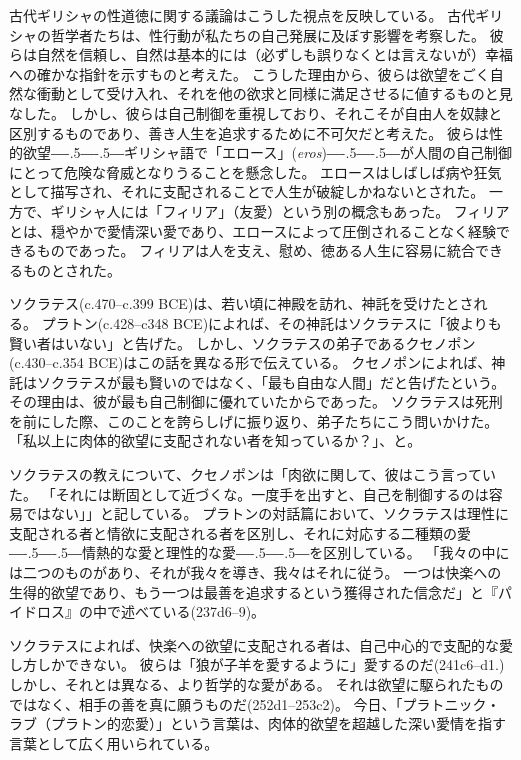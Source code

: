 \documentclass[paper=a4,book,openany]{jlreq}
\def\DDASH{―\kern-.5\zw―\kern-.5\zw―}
\begin{document}
古代ギリシャの性道徳に関する議論はこうした視点を反映している。
古代ギリシャの哲学者たちは、性行動が私たちの自己発展に及ぼす影響を考察した。
彼らは自然を信頼し、自然は基本的には（必ずしも誤りなくとは言えないが）幸福への確かな指針を示すものと考えた。
こうした理由から、彼らは欲望をごく自然な衝動として受け入れ、それを他の欲求と同様に満足させるに値するものと見なした。
しかし、彼らは自己制御を重視しており、それこそが自由人を奴隷と区別するものであり、善き人生を追求するために不可欠だと考えた。
彼らは性的欲望{\DDASH}ギリシャ語で「エロース」(\emph{eros}){\DDASH}が人間の自己制御にとって危険な脅威となりうることを懸念した。
エロースはしばしば病や狂気として描写され、それに支配されることで人生が破綻しかねないとされた。
一方で、ギリシャ人には「フィリア」（友愛）という別の概念もあった。
フィリアとは、穏やかで愛情深い愛であり、エロースによって圧倒されることなく経験できるものであった。
フィリアは人を支え、慰め、徳ある人生に容易に統合できるものとされた。

ソクラテス(c.470--c.399 BCE)は、若い頃に神殿を訪れ、神託を受けたとされる。
プラトン(c.428--c348 BCE)によれば、その神託はソクラテスに「彼よりも賢い者はいない」と告げた。
しかし、ソクラテスの弟子であるクセノポン(c.430--c.354 BCE)はこの話を異なる形で伝えている。
クセノポンによれば、神託はソクラテスが最も賢いのではなく、「最も自由な人間」だと告げたという。
その理由は、彼が最も自己制御に優れていたからであった。
ソクラテスは死刑を前にした際、このことを誇らしげに振り返り、弟子たちにこう問いかけた。
「私以上に肉体的欲望に支配されない者を知っているか？」、と\citep[16]{xenophon13:_apolog_socrat}。

ソクラテスの教えについて、クセノポンは「肉欲に関して、彼はこう言っていた。
「それには断固として近づくな。一度手を出すと、自己を制御するのは容易ではない」」\citep{xenophon13:_memor}と記している。
プラトンの対話篇において、ソクラテスは理性に支配される者と情欲に支配される者を区別し、それに対応する二種類の愛{\DDASH}情熱的な愛と理性的な愛{\DDASH}を区別している。
「我々の中には二つのものがあり、それが我々を導き、我々はそれに従う。
一つは快楽への生得的欲望であり、もう一つは最善を追求するという獲得された信念だ」と『パイドロス』の中で述べている(237d6--9)。

ソクラテスによれば、快楽への欲望に支配される者は、自己中心的で支配的な愛し方しかできない。
彼らは「狼が子羊を愛するように」愛するのだ(241c6--d1.)%
しかし、それとは異なる、より哲学的な愛がある。
それは欲望に駆られたものではなく、相手の善を真に願うものだ(252d1--253c2)。
今日、「プラトニック・ラブ（プラトン的恋愛）」という言葉は、肉体的欲望を超越した深い愛情を指す言葉として広く用いられている。
\end{document}
